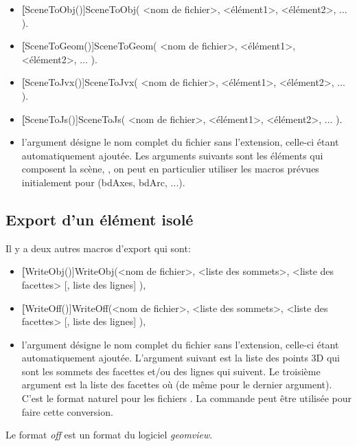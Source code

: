 \begin{itemize}
 \item \util \textbf[SceneToObj()]{SceneToObj( <nom de fichier>, <élément1>, <élément2>, ... )}.
 \item \util \textbf[SceneToGeom()]{SceneToGeom( <nom de fichier>, <élément1>, <élément2>, ... )}.
 \item \util \textbf[SceneToJvx()]{SceneToJvx( <nom de fichier>, <élément1>, <élément2>, ... )}.
 \item \util \textbf[SceneToJs()]{SceneToJs( <nom de fichier>, <élément1>, <élément2>, ... )}.
 \item \desc l'argument  désigne le nom complet du fichier sans l'extension, celle-ci étant automatiquement ajoutée. Les arguments suivants sont les éléments qui composent la scène, , on peut en particulier utiliser les macros prévues initialement pour  (bdAxes, bdArc, ...).
\end{itemize}

\subsection{Export d'un élément isolé}

Il y a deux autres macros d'export qui sont:

\begin{itemize}
 \item \util \textbf[WriteObj()]{WriteObj(<nom de fichier>, <liste des sommets>, <liste des facettes> [, liste des lignes] )},
 \item \util \textbf[WriteOff()]{WriteOff(<nom de fichier>, <liste des sommets>, <liste des facettes> [, liste des lignes] )},
 \item \desc l'argument  désigne le nom complet du fichier sans l'extension, celle-ci étant automatiquement ajoutée. L'argument suivant est la liste des points 3D qui sont les sommets des facettes et/ou des lignes qui suivent. Le troisième argument est la liste des facettes où  (de même pour le dernier argument). C'est le format naturel pour les fichiers . La commande  peut être utilisée pour faire cette conversion.
\end{itemize}

Le format \textit{off} est un format du logiciel \textit{geomview}.
